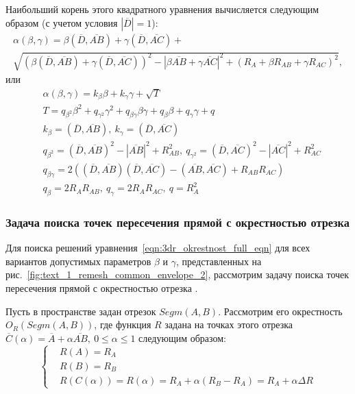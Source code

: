 Наибольший корень этого квадратного уравнения вычисляется следующим образом (с учетом условия $|\overline{D}| = 1$):
\begin{multline}
	\alpha(\beta, \gamma) = \beta (\overline{D}, \overline{AB}) + \gamma (\overline{D}, \overline{AC}) + \\
	\sqrt{(\beta (\overline{D}, \overline{AB}) + \gamma (\overline{D}, \overline{AC}))^2 - |\beta \overline{AB} + \gamma \overline{AC}|^2 + (R_A + \beta R_{AB} + \gamma R_{AC})^2},
\end{multline}
или
\begin{equation}\label{eqn:3dr_okrestnost_full_eqn}
	\begin{aligned}
		& \alpha(\beta, \gamma) = k_{\beta} \beta + k_{\gamma} \gamma + \sqrt{T} \\
		& T = q_{\beta^2} \beta^2 + q_{\gamma^2} \gamma^2 + q_{\beta \gamma} \beta \gamma + q_{\beta} \beta + q_{\gamma} \gamma + q \\
		& k_{\beta} = (\overline{D}, \overline{AB}), \ k_{\gamma} = (\overline{D}, \overline{AC}) \\
		& q_{\beta^2} = (\overline{D}, \overline{AB})^2 - |\overline{AB}|^2 + R_{AB}^2, \ q_{\gamma^2} = (\overline{D}, \overline{AC})^2 - |\overline{AC}|^2 + R_{AC}^2 \\
		& q_{\beta \gamma} = 2 \left( (\overline{D}, \overline{AB}) (\overline{D}, \overline{AC}) - (\overline{AB}, \overline{AC}) + R_{AB}R_{AC} \right) \\
		& q_{\beta} = 2 R_A R_{AB}, \ q_{\gamma} = 2 R_A R_{AC}, \ q = R_A^2
	\end{aligned}
\end{equation}

\subsubsection{Задача поиска точек пересечения прямой с окрестностью отрезка}\label{sec:text_1_geo_prim_line_eps_intersect}

Для поиска решений уравнения~\eqref{eqn:3dr_okrestnost_full_eqn} для всех вариантов допустимых параметров $\beta$ и $\gamma$, представленных на рис.~\ref{fig:text_1_remesh_common_envelope_2}, рассмотрим задачу поиска точек пересечения прямой с окрестностью отрезка \cite{Rybakov2017Flight}.

Пусть в пространстве задан отрезок $Segm(A, B)$.
Рассмотрим его окрестность $O_R(Segm(A, B))$, где функция $R$ задана на точках этого отрезка $\overline{C}(\alpha) = \overline{A} + \alpha \overline{AB}, \ 0 \le \alpha \le 1$ следующим образом:
\begin{equation}
	\left\{
		\begin{aligned}
			& R(A) = R_A \\
			& R(B) = R_B \\
			& R(C(\alpha)) = R(\alpha) = R_A + \alpha (R_B - R_A) = R_A + \alpha \Delta R
		\end{aligned}
	\right.
\end{equation}

